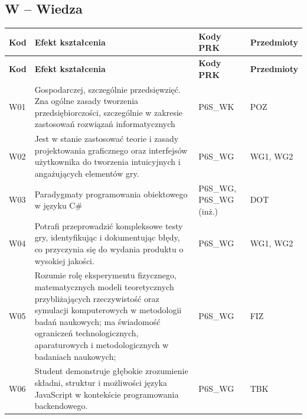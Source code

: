 \documentclass[12pt,a4paper]{article}
\newcommand{\thdrule}{\noalign{\global\setlength{\extrarowheight}{0pt}}}
\newcommand{\thdend}{\noalign{\global\setlength{\extrarowheight}{4pt}}}
\begin{document}
\bigskip
\subsection*{W -- Wiedza}

{\scriptsize
\begin{longtable}{m{1cm}m{8.8cm}m{2.1cm}m{2.5cm}}
\thdrule\toprule
\rowcolor{pjatkRed} {\color{white}\footnotesize\textbf{\vphantom{Ag}Kod}} & {\color{white}\footnotesize\textbf{\vphantom{Ag}Efekt kształcenia}} & {\color{white}\footnotesize\textbf{\vphantom{Ag}Kody PRK}} & {\color{white}\footnotesize\textbf{\vphantom{Ag}Przedmioty}} \\
\midrule\thdend
\endfirsthead
\thdrule\toprule
\rowcolor{pjatkRed} {\color{white}\footnotesize\textbf{\vphantom{Ag}Kod}} & {\color{white}\footnotesize\textbf{\vphantom{Ag}Efekt kształcenia}} & {\color{white}\footnotesize\textbf{\vphantom{Ag}Kody PRK}} & {\color{white}\footnotesize\textbf{\vphantom{Ag}Przedmioty}} \\
\midrule\thdend
\endhead
\rowcolor{tableRowLight} W01 & Gospodarczej, szczególnie przedsięwzięć. Zna ogólne zasady tworzenia przedsiębiorczości, szczególnie w zakresie zastosowań rozwiązań informatycznych & {\scriptsize P6S\_WK} & {\scriptsize POZ} \\
\rowcolor{tableRowAlt} W02 & Jest w stanie zastosować teorie i zasady projektowania graficznego oraz interfejsów użytkownika do tworzenia intuicyjnych i angażujących elementów gry. & {\scriptsize P6S\_WG} & {\scriptsize WG1, WG2} \\
\rowcolor{tableRowLight} W03 & Paradygmaty programowania obiektowego w języku C\# & {\scriptsize P6S\_WG, P6S\_WG {\scriptsize (inż.)}} & {\scriptsize DOT} \\
\rowcolor{tableRowAlt} W04 & Potrafi przeprowadzić kompleksowe testy gry, identyfikując i dokumentując błędy, co przyczynia się do wydania produktu o wysokiej jakości. & {\scriptsize P6S\_WG} & {\scriptsize WG1, WG2} \\
\rowcolor{tableRowLight} W05 & Rozumie rolę eksperymentu fizycznego, matematycznych modeli teoretycznych przybliżających rzeczywistość oraz symulacji komputerowych w metodologii badań naukowych; ma świadomość ograniczeń technologicznych, aparaturowych i metodologicznych w badaniach naukowych; & {\scriptsize P6S\_WG} & {\scriptsize FIZ} \\
\rowcolor{tableRowAlt} W06 & Student demonstruje głębokie zrozumienie składni, struktur i możliwości języka JavaScript w kontekście programowania backendowego. & {\scriptsize P6S\_WG} & {\scriptsize TBK} \\

\end{longtable}}
\end{document}
